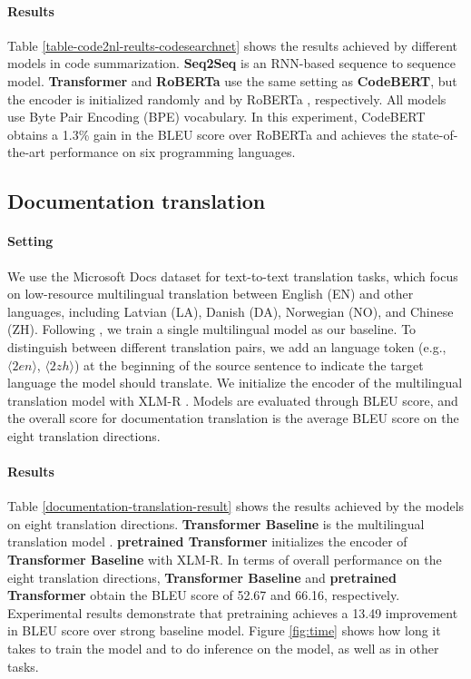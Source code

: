 \documentclass[sigconf,nonacm,screen]{acmart}
\begin{document}
\paragraph{Results} Table \ref{table-code2nl-reults-codesearchnet} shows the results achieved by different models in code summarization. \textbf{Seq2Seq} is an RNN-based sequence to sequence model. \textbf{Transformer} and \textbf{RoBERTa} use the same setting as \textbf{CodeBERT}, but the encoder is initialized randomly and by RoBERTa \cite{liu2019roberta}, respectively. All models use Byte Pair Encoding (BPE) \cite{sennrich2015neural} vocabulary. In this experiment, CodeBERT obtains a 1.3\% gain in the BLEU score over RoBERTa and achieves the state-of-the-art performance on six programming languages. 


\subsection{Documentation translation}
\paragraph{Setting}
We use the Microsoft Docs dataset for text-to-text translation tasks, which focus on low-resource multilingual translation between English (EN) and other languages, including Latvian (LA), Danish (DA), Norwegian (NO), and Chinese (ZH).
Following \citet{johnson2017google}, we train a single multilingual model as our baseline.
To distinguish between different translation pairs, we add an language token (e.g., $\langle\mathit{2en}\rangle$, $\langle\mathit{2zh}\rangle$) at the beginning of the source sentence to indicate the target language the model should translate.
We  initialize the encoder of the multilingual translation model with XLM-R \cite{conneau2019unsupervised}.
Models are evaluated through BLEU \cite{papineni2002bleu} score,
and the overall score for documentation translation is the average BLEU score on the eight translation directions. 


\paragraph{Results}
Table \ref{documentation-translation-result} shows the results achieved by the models on eight translation directions.
\textbf{Transformer Baseline} is the multilingual translation model \cite{johnson2017google}.
\textbf{pretrained Transformer} initializes the encoder of \textbf{ Transformer Baseline} with XLM-R\cite{conneau2019unsupervised}.
In terms of overall performance on the eight translation directions, \textbf{Transformer Baseline} and \textbf{pretrained Transformer} obtain the BLEU score of 52.67 and 66.16, respectively.
Experimental results demonstrate that pretraining achieves a 13.49 improvement in BLEU score over strong baseline model. Figure \ref{fig:time} shows how long it takes to train the model and to do inference on the model, as well as in other tasks.
\end{document}

